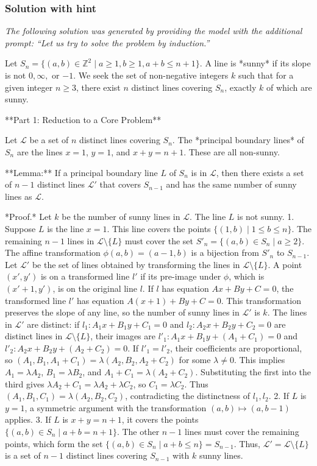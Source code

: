 \subsubsection{Solution with hint}

\textit{The following solution was generated by providing the model with the additional prompt: ``Let us try to solve the problem by induction.''}

Let $S_n = \{(a,b) \in \mathbb{Z}^2 \mid a \ge 1, b \ge 1, a+b \le n+1\}$. A line is *sunny* if its slope is not $0, \infty,$ or $-1$. We seek the set of non-negative integers $k$ such that for a given integer $n \ge 3$, there exist $n$ distinct lines covering $S_n$, exactly $k$ of which are sunny.

**Part 1: Reduction to a Core Problem**

Let $\mathcal{L}$ be a set of $n$ distinct lines covering $S_n$. The *principal boundary lines* of $S_n$ are the lines $x=1$, $y=1$, and $x+y=n+1$. These are all non-sunny.

**Lemma:** If a principal boundary line $L$ of $S_n$ is in $\mathcal{L}$, then there exists a set of $n-1$ distinct lines $\mathcal{L}'$ that covers $S_{n-1}$ and has the same number of sunny lines as $\mathcal{L}$.

*Proof.* Let $k$ be the number of sunny lines in $\mathcal{L}$. The line $L$ is not sunny.
1.  Suppose $L$ is the line $x=1$. This line covers the points $\{(1,b) \mid 1 \le b \le n\}$. The remaining $n-1$ lines in $\mathcal{L} \setminus \{L\}$ must cover the set $S'_n = \{(a,b) \in S_n \mid a \ge 2\}$. The affine transformation $\phi(a,b) = (a-1, b)$ is a bijection from $S'_n$ to $S_{n-1}$. Let $\mathcal{L}'$ be the set of lines obtained by transforming the lines in $\mathcal{L} \setminus \{L\}$. A point $(x',y')$ is on a transformed line $l'$ if its pre-image under $\phi$, which is $(x'+1, y')$, is on the original line $l$. If $l$ has equation $Ax+By+C=0$, the transformed line $l'$ has equation $A(x+1)+By+C=0$. This transformation preserves the slope of any line, so the number of sunny lines in $\mathcal{L}'$ is $k$. The lines in $\mathcal{L}'$ are distinct: if $l_1: A_1x+B_1y+C_1=0$ and $l_2: A_2x+B_2y+C_2=0$ are distinct lines in $\mathcal{L} \setminus \{L\}$, their images are $l'_1: A_1x+B_1y+(A_1+C_1)=0$ and $l'_2: A_2x+B_2y+(A_2+C_2)=0$. If $l'_1=l'_2$, their coefficients are proportional, so $(A_1, B_1, A_1+C_1) = \lambda(A_2, B_2, A_2+C_2)$ for some $\lambda \ne 0$. This implies $A_1=\lambda A_2$, $B_1=\lambda B_2$, and $A_1+C_1=\lambda(A_2+C_2)$. Substituting the first into the third gives $\lambda A_2+C_1=\lambda A_2+\lambda C_2$, so $C_1=\lambda C_2$. Thus $(A_1,B_1,C_1)=\lambda(A_2,B_2,C_2)$, contradicting the distinctness of $l_1, l_2$.
2.  If $L$ is $y=1$, a symmetric argument with the transformation $(a,b) \mapsto (a, b-1)$ applies.
3.  If $L$ is $x+y=n+1$, it covers the points $\{(a,b) \in S_n \mid a+b=n+1\}$. The other $n-1$ lines must cover the remaining points, which form the set $\{(a,b) \in S_n \mid a+b \le n\} = S_{n-1}$. Thus, $\mathcal{L}' = \mathcal{L} \setminus \{L\}$ is a set of $n-1$ distinct lines covering $S_{n-1}$ with $k$ sunny lines.

